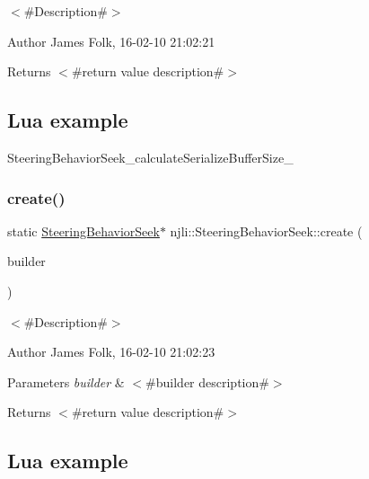 $<$\#\+Description\#$>$ 

\begin{DoxyAuthor}{Author}
James Folk, 16-\/02-\/10 21\+:02\+:21
\end{DoxyAuthor}
\begin{DoxyReturn}{Returns}
$<$\#return value description\#$>$
\end{DoxyReturn}
\hypertarget{classnjli_1_1_steering_behavior_wander_ex1}{}\subsection{Lua example}\label{classnjli_1_1_steering_behavior_wander_ex1}

\begin{DoxyCodeInclude}
\end{DoxyCodeInclude}
Steering\+Behavior\+Seek\+\_\+calculate\+Serialize\+Buffer\+Size\+\_\+ \mbox{\label{classnjli_1_1_steering_behavior_seek_af048f29143c4223cbe17b27ecc98c244}} 
\subsubsection{\texorpdfstring{create()}{create()}\hspace{0.1cm}{\footnotesize\ttfamily [2/2]}}
{\footnotesize\ttfamily static \mbox{\hyperlink{classnjli_1_1_steering_behavior_seek}{Steering\+Behavior\+Seek}}$\ast$ njli\+::\+Steering\+Behavior\+Seek\+::create (\begin{DoxyParamCaption}\item[{const \mbox{\hyperlink{classnjli_1_1_steering_behavior_seek_builder}{Steering\+Behavior\+Seek\+Builder}} \&}]{builder }\end{DoxyParamCaption})\hspace{0.3cm}{\ttfamily [static]}}



$<$\#\+Description\#$>$ 

\begin{DoxyAuthor}{Author}
James Folk, 16-\/02-\/10 21\+:02\+:23
\end{DoxyAuthor}

\begin{DoxyParams}{Parameters}
{\em builder} & $<$\#builder description\#$>$\\
\hline
\end{DoxyParams}
\begin{DoxyReturn}{Returns}
$<$\#return value description\#$>$
\end{DoxyReturn}
\hypertarget{classnjli_1_1_steering_behavior_wander_ex1}{}\subsection{Lua example}\label{classnjli_1_1_steering_behavior_wander_ex1}

